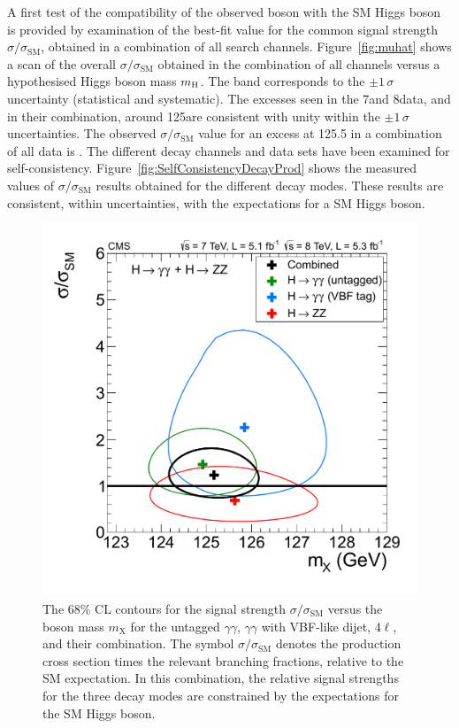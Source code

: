 \documentclass[11pt,twoside,a4paper,cmspaper,final]{cms-tdr}
\begin{document}
A first test of the compatibility of the observed boson with the SM
Higgs boson is provided by examination of
the best-fit value for the common signal strength $\sigma/\sigma_{\mathrm{SM}}$,
obtained in a combination of all search channels.
Figure~\ref{fig:muhat} shows a scan
of the overall $\sigma/\sigma_{\mathrm{SM}}$ obtained in the combination of all channels versus a hypothesised
Higgs boson mass $m_{\mathrm{H}}$. The band corresponds to the ${\pm}1\,\sigma$ uncertainty (statistical and systematic).
The excesses seen in the 7\TeV and 8\TeV data, and in their combination, around 125\GeV are consistent with unity
within the ${\pm}1\,\sigma$ uncertainties. The observed $\sigma/\sigma_\text{SM}$ value for an excess at 125.5\GeV
in a combination of all data is \MUHAT.
The different decay channels and data sets have been
examined for self-consistency.
Figure~\ref{fig:SelfConsistencyDecayProd}
shows the measured values of  $\sigma/\sigma_\text{SM}$ results
obtained for the different decay modes.
These results are consistent, within uncertainties, with the
expectations for a SM Higgs boson.

\begin{figure} [htbp]
\begin{center}
\includegraphics[width=\cmsFigWideWidth]{sqr_mass_scan_2d_all_white}
\caption{
The 68\% CL contours for the signal strength $\sigma/\sigma_\text{SM}$ versus the boson mass $m_\mathrm{X}$ for the untagged $\gamma \gamma$,
   $\gamma \gamma$ with VBF-like dijet, 4$\ell$, and their
   combination.
The symbol $\sigma/\sigma_\mathrm{SM}$ denotes the
      production cross section times the relevant branching fractions,
relative to the SM expectation.   In this combination, the relative signal strengths for the three
   decay modes
   are constrained by the expectations for the SM Higgs boson.
}
\label{fig:fit_mass}
\end{center}
\end{figure}
\end{document}
